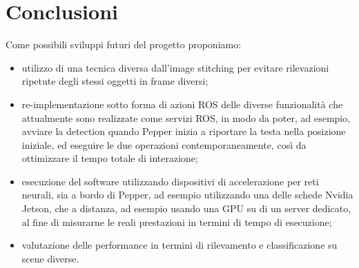 \section{Conclusioni}

Come possibili sviluppi futuri del progetto proponiamo:
\begin{itemize}
    \item utilizzo di una tecnica diversa dall'image stitching per evitare rilevazioni ripetute degli stessi oggetti in frame diversi;
    \item re-implementazione sotto forma di azioni ROS delle diverse funzionalità che attualmente sono realizzate come servizi ROS, in modo da poter, ad esempio, avviare la detection quando Pepper inizia a riportare la testa nella posizione iniziale, ed eseguire le due operazioni contemporaneamente, così da ottimizzare il tempo totale di interazione;
    \item esecuzione del software utilizzando dispositivi di accelerazione per reti neurali, sia a bordo di Pepper, ad esempio utilizzando una delle schede Nvidia Jetson, che a distanza, ad esempio usando una GPU su di un server dedicato, al fine di misurarne le reali prestazioni in termini di tempo di esecuzione;
    \item valutazione delle performance in termini di rilevamento e classificazione su scene diverse.
\end{itemize} 